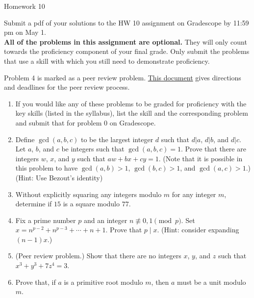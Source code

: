 \documentclass[12pt]{article}
\begin{document}
\begin{center}
{\Large Homework 10}\\


\end{center}
Submit a pdf of your solutions to the HW 10 assignment on Gradescope by 11:59 pm on May 1.
\\[5pt]
\textbf{All of the problems in this assignment are optional. } They will only count towards the proficiency component of your final grade. Only submit the problems that use a skill  with which you still need to demonstrate proficiency.

\noindent Problem 4 is marked as a peer review problem. \href{https://docs.google.com/document/d/1jSw9pmMJJFUx_6dTkcUi4k4HJNIrrIIgs9zdWhAycx0/edit?usp=drive_link}{This document} gives directions and deadlines for the peer review process.
\\[3pt]


\begin{enumerate}
\item[0.] If you would like any of these problems to be graded for proficiency with the key skills (listed in the syllabus), list the skill and the corresponding problem and submit that for problem 0 on Gradescope.  

 \item Define $\gcd(a,b,c)$ to be the largest integer $d$ such that $d|a$, $d|b$, and $d|c$.  Let $a$, $b$, and $c$ be integers such that $\gcd(a,b,c)=1$. Prove that there are integers $w$, $x$, and $y$ such that $aw+bx+cy=1$.  (Note that it is possible in this problem to have $\gcd(a,b)>1$, $\gcd(b,c)>1$, and $\gcd(a,c)>1$.) (Hint: Use Bezout's identity)
 
\item Without explicitly squaring any integers modulo $m$ for any integer $m$, determine if $15$ is a square modulo $77$. 

 \item Fix a prime number $p$ and an integer $n\not\equiv 0,1\pmod{p}$. Set $x=n^{p-2}+n^{p-3}+\cdots+n+1$. Prove that $p\mid x$. (Hint: consider expanding $(n-1)x$.)

\item(Peer review problem.)  Show that there are no integers $x$, $y$, and $z$ such that $x^3+y^3+7z^4=3$. 

\item Prove that, if $a$ is a primitive root modulo $m$, then $a$ must be a unit modulo $m$. 


\end{enumerate}
\end{document}
